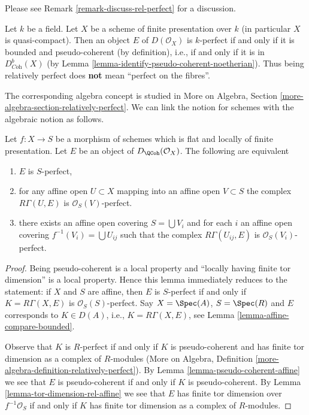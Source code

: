 \noindent
Please see Remark \ref{remark-discuss-rel-perfect} for a discussion.

\begin{example}
\label{example-relatively-perfect-field}
Let $k$ be a field. Let $X$ be a scheme of finite presentation over $k$
(in particular $X$ is quasi-compact). Then an object $E$ of $D(\mathcal{O}_X)$
is $k$-perfect if and only if it is bounded and pseudo-coherent
(by definition), i.e., if and only if it is in $D^b_{\textit{Coh}}(X)$
(by Lemma \ref{lemma-identify-pseudo-coherent-noetherian}).
Thus being relatively perfect does {\bf not} mean ``perfect on the fibres''.
\end{example}

\noindent
The corresponding algebra concept is studied in
More on Algebra, Section \ref{more-algebra-section-relatively-perfect}.
We can link the notion for schemes with the algebraic notion
as follows.

\begin{lemma}
\label{lemma-affine-locally-rel-perfect}
Let $f : X \to S$ be a morphism of schemes which is flat and
locally of finite presentation. Let $E$ be an object of
$D_\QCoh(\mathcal{O}_X)$. The following are equivalent
\begin{enumerate}
\item $E$ is $S$-perfect,
\item for any affine open $U \subset X$ mapping into an affine open
$V \subset S$ the complex $R\Gamma(U, E)$ is $\mathcal{O}_S(V)$-perfect.
\item there exists an affine open covering $S = \bigcup V_i$
and for each $i$ an affine open covering $f^{-1}(V_i) = \bigcup U_{ij}$
such that the complex $R\Gamma(U_{ij}, E)$ is $\mathcal{O}_S(V_i)$-perfect.
\end{enumerate}
\end{lemma}

\begin{proof}
Being pseudo-coherent is a local property and
``locally having finite tor dimension'' is a local property.
Hence this lemma immediately reduces to the statement:
if $X$ and $S$ are affine, then $E$ is $S$-perfect
if and only if $K = R\Gamma(X, E)$ is $\mathcal{O}_S(S)$-perfect.
Say $X = \Spec(A)$, $S = \Spec(R)$ and $E$ corresponds to
$K \in D(A)$, i.e., $K = R\Gamma(X, E)$, see
Lemma \ref{lemma-affine-compare-bounded}.

\medskip\noindent
Observe that $K$ is $R$-perfect if and only if $K$ is
pseudo-coherent and has finite tor dimension as a complex
of $R$-modules (More on Algebra, Definition
\ref{more-algebra-definition-relatively-perfect}).
By Lemma \ref{lemma-pseudo-coherent-affine}
we see that $E$ is pseudo-coherent if and only if
$K$ is pseudo-coherent.
By Lemma \ref{lemma-tor-dimension-rel-affine} we see that
$E$ has finite tor dimension over $f^{-1}\mathcal{O}_S$
if and only if $K$ has finite tor dimension as a complex of
$R$-modules.
\end{proof}

